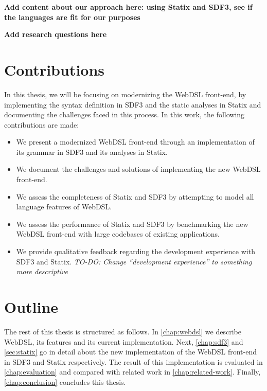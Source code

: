   \textbf{Add content about our approach here: using Statix and SDF3, see if the languages are fit for our purposes}

  \textbf{Add research questions here}

  \section{\label{sec:contributions}Contributions}
    In this thesis, we will be focusing on modernizing the WebDSL front-end, by implementing the syntax definition in SDF3 and the static analyses in Statix and documenting the challenges faced in this process. In this work, the following contributions are made:

    \begin{itemize}
      \item We present a modernized WebDSL front-end through an implementation of its grammar in SDF3 and its analyses in Statix.
      \item We document the challenges and solutions of implementing the new WebDSL front-end.
      \item We assess the completeness of Statix and SDF3 by attempting to model all language features of WebDSL.
      \item We assess the performance of Statix and SDF3 by benchmarking the new WebDSL front-end with large codebases of existing applications.
      \item We provide qualitative feedback regarding the development experience with SDF3 and Statix. \textit{TO-DO: Change ``development experience'' to something more descriptive}
    \end{itemize}

  \section{\label{sec:outline}Outline}
    The rest of this thesis is structured as follows. In \cref{chap:webdsl} we describe WebDSL, its features and its current implementation. Next, \cref{chap:sdf3} and \cref{sec:statix} go in detail about the new implementation of the WebDSL front-end in SDF3 and Statix respectively. The result of this implementation is evaluated in \cref{chap:evaluation} and compared with related work in \cref{chap:related-work}. Finally, \cref{chap:conclusion} concludes this thesis.
